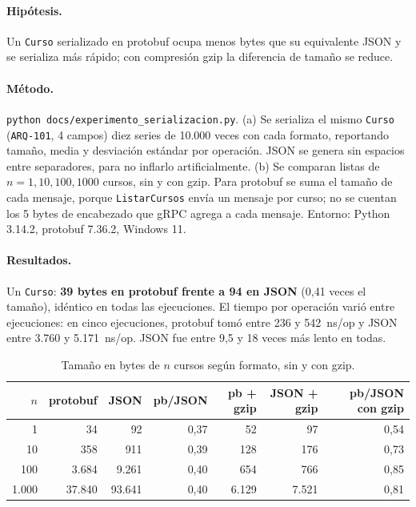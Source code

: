 \documentclass[11pt,spanish]{article}
\begin{document}
\paragraph{Hipótesis.} Un \texttt{Curso} serializado en protobuf ocupa menos bytes que su equivalente JSON y se serializa más rápido; con compresión gzip la diferencia de tamaño se reduce.

\paragraph{Método.} \texttt{python docs/experimento\_serializacion.py}. (a) Se serializa el mismo \texttt{Curso} (\texttt{ARQ-101}, 4 campos) diez series de 10.000 veces con cada formato, reportando tamaño, media y desviación estándar por operación. JSON se genera sin espacios entre separadores, para no inflarlo artificialmente. (b) Se comparan listas de $n = 1, 10, 100, 1000$ cursos, sin y con gzip. Para protobuf se suma el tamaño de cada mensaje, porque \texttt{ListarCursos} envía un mensaje por curso; no se cuentan los 5 bytes de encabezado que gRPC agrega a cada mensaje. Entorno: Python 3.14.2, protobuf 7.36.2, Windows 11.

\paragraph{Resultados.} Un \texttt{Curso}: \textbf{39 bytes en protobuf frente a 94 en JSON} (0,41 veces el tamaño), idéntico en todas las ejecuciones. El tiempo por operación varió entre ejecuciones: en cinco ejecuciones, protobuf tomó entre 236 y 542~ns/op y JSON entre 3.760 y 5.171~ns/op. JSON fue entre 9,5 y 18 veces más lento en todas.

\begin{table}[H]
\centering
\small
\begin{tabular}{rrrrrrr}
\toprule
$n$ & protobuf & JSON & pb/JSON & pb + gzip & JSON + gzip & pb/JSON con gzip \\
\midrule
1 & 34 & 92 & 0,37 & 52 & 97 & 0,54 \\
10 & 358 & 911 & 0,39 & 128 & 176 & 0,73 \\
100 & 3.684 & 9.261 & 0,40 & 654 & 766 & 0,85 \\
1.000 & 37.840 & 93.641 & 0,40 & 6.129 & 7.521 & 0,81 \\
\bottomrule
\end{tabular}
\caption{Tamaño en bytes de $n$ cursos según formato, sin y con gzip.}
\end{table}
\end{document}
